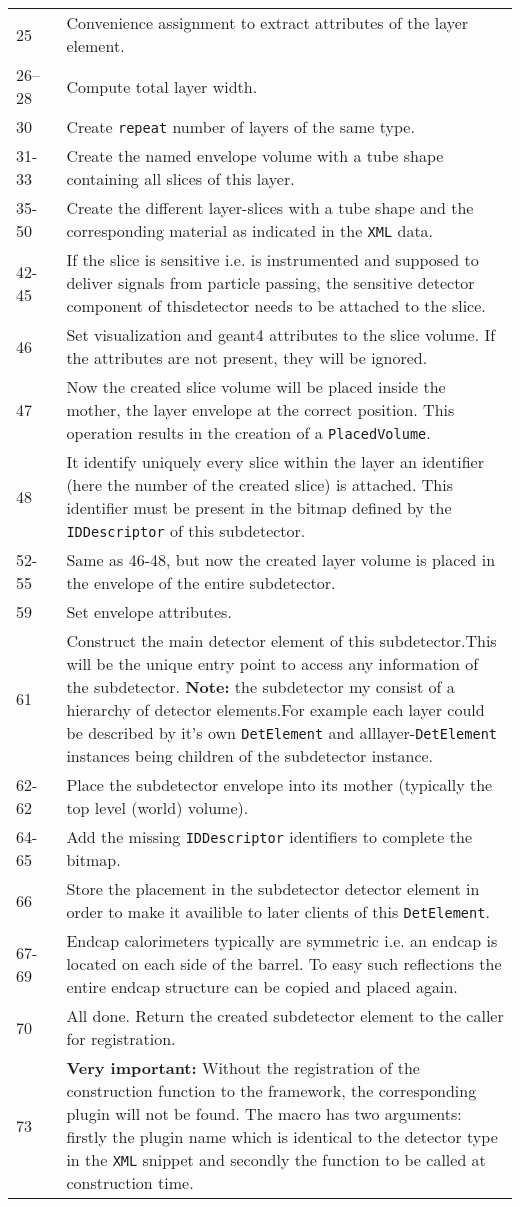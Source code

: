 {\begin{tabular} {p{0.1\linewidth}|p{0.9\linewidth}}
25 & Convenience assignment to extract attributes of the layer element.\\
26--28 & Compute total layer width.\\
30 & Create \texttt{repeat} number of layers of the same type.\\
31-33 & Create the named envelope volume with a tube shape containing all slices of this layer.\\
35-50 & Create the different layer-slices with a tube shape and the corresponding material as indicated in the \texttt{XML} data.\\
42-45 & If the slice is sensitive i.e. is instrumented and supposed to deliver signals from particle passing, the sensitive detector component of thisdetector needs to be attached to the slice.\\
46 & Set visualization and geant4 attributes to the slice volume. If the attributes are not present, they will be ignored.\\
47 & Now the created slice volume will be placed inside the mother, the layer envelope at the correct position. This operation results in the creation of a \texttt{PlacedVolume}.\\
48 & It identify uniquely every slice within the layer an identifier (here the number of the created slice) is attached. This identifier must be present in the bitmap defined by the \texttt{IDDescriptor} of this subdetector.\\
52-55 & Same as 46-48, but now the created layer volume is placed in the envelope of the entire subdetector.\\
59 & Set envelope attributes.\\
61 & Construct the main detector element of this subdetector.This will be the unique entry point to access any information of the subdetector. {\textbf{Note:}} the subdetector my consist of a hierarchy of detector elements.For example each layer could be described by it's own \texttt{DetElement} and alllayer-\texttt{DetElement} instances being children of the subdetector instance.\\
62-62 & Place the subdetector envelope into its mother (typically the top level (world) volume).\\
64-65 & Add the missing \texttt{IDDescriptor} identifiers to complete the bitmap.\\
66 & Store the placement in the subdetector detector element in order to make it availible to later clients of this \texttt{DetElement}. \\
67-69 & Endcap calorimeters typically are symmetric i.e. an endcap is located on each side of the barrel. To easy such reflections the entire endcap structure can be copied and placed again. \\
70 & All done. Return the created subdetector element to the caller for registration. \\ 
73 & \textbf{Very important:} Without the registration of the construction function to the framework, the corresponding plugin will not be found. The macro has two arguments: firstly the plugin name which is identical to the detector type in the \texttt{XML} snippet and secondly the function to be called at construction time.
\end{tabular}
}
